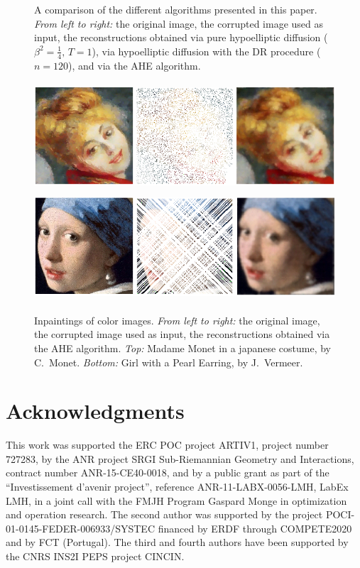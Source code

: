 \documentclass[proc]{edpsmath}
\begin{document}
\begin{figure}
  \caption{A comparison of the different algorithms presented in this paper. \emph{From left to right:} the original image, the corrupted image used as input, the reconstructions obtained via pure hypoelliptic diffusion ($\beta^2=\frac14,\, T=1$),
  {via  hypoelliptic diffusion with the DR procedure ($n=120$)}, and via the AHE algorithm.}
  \label{fig:comparison}
\end{figure}


\begin{figure}
  \includegraphics[height=4.0cm]{imgs/color1} \\ \vspace{.5em}
  \includegraphics[height=4.0cm]{imgs/color2}
  \caption{Inpaintings of color images. \emph{From left to right:} the original image, the corrupted image used as input, the reconstructions obtained via the AHE algorithm. \emph{Top:} Madame Monet in a japanese costume, by C.\ Monet. \emph{Bottom:} Girl with a Pearl Earring, by J.\ Vermeer.
  }
  \label{fig:color-images}
\end{figure}


\section*{Acknowledgments}
This work was supported  the ERC POC project ARTIV1, project number
727283, by the ANR project SRGI Sub-Riemannian Geometry and Interactions,
contract number ANR-15-CE40-0018, and by a public grant as part of the ``Investissement d'avenir project'', reference ANR-11-LABX-0056-LMH, LabEx LMH, in a joint call with the FMJH Program Gaspard Monge in optimization and operation research. The second author was supported by the project POCI-01-0145-FEDER-006933/SYSTEC financed by ERDF through COMPETE2020 and by FCT (Portugal). The third and fourth authors have been supported by the CNRS INS2I PEPS project CINCIN.



\end{document}
